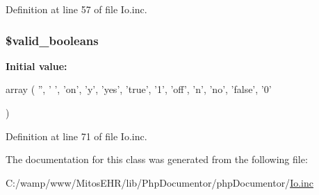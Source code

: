 \-Definition at line 57 of file \-Io.\-inc.

\hypertarget{class_io_a9d0bf395115e805044d0986a562b7ea5}{
\subsubsection[{\$valid\-\_\-booleans}]{\setlength{\rightskip}{0pt plus 5cm}\$valid\-\_\-booleans}}\label{class_io_a9d0bf395115e805044d0986a562b7ea5}
{\bfseries \-Initial value\-:}
\begin{DoxyCode}
 array
    (
        '', ' ', 'on', 'y', 'yes', 'true', '1', 
        'off', 'n', 'no', 'false', '0'

    )
\end{DoxyCode}


\-Definition at line 71 of file \-Io.\-inc.



\-The documentation for this class was generated from the following file\-:\begin{DoxyCompactItemize}
\item 
\-C\-:/wamp/www/\-Mitos\-E\-H\-R/lib/\-Php\-Documentor/php\-Documentor/\hyperlink{_io_8inc}{\-Io.\-inc}\end{DoxyCompactItemize}
